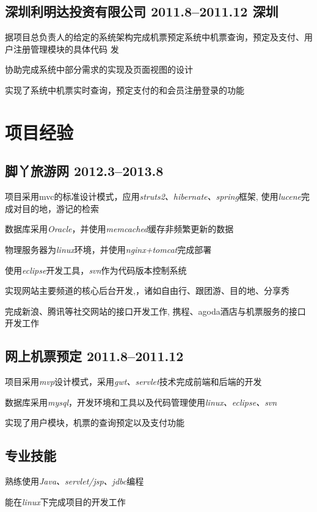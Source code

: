\documentclass[11pt,a4paper]{article}
\renewenvironment{itemize}{
  \begin{list}{}{
    \setlength{\leftmargin}{1.5em}
  }
}{
  \end{list}
}
\begin{document}
\subsection*{深圳利明达投资有限公司 2011.8--2011.12 深圳}

\begin{itemize}
  \item 据项目总负责人的给定的系统架构完成机票预定系统中机票查询，预定及支付、用户注册管理模块的具体代码
    发
  \item 协助完成系统中部分需求的实现及页面视图的设计
  \item 实现了系统中机票实时查询，预定支付的和会员注册登录的功能
\end{itemize}

\section*{项目经验}

\subsection*{脚丫旅游网 2012.3--2013.8}

\begin{itemize}
\item 项目采用mvc的标准设计模式，应用{\it struts2、hibernate、spring}框架, 使用{\it lucene}完成对目的地，游记的检索
\item 数据库采用{\it Oracle}，并使用{\it memcached}缓存非频繁更新的数据
\item 物理服务器为{\it linux}环境，并使用{\it nginx+tomcat}完成部署
\item 使用{\it eclipse}开发工具，{\it svn}作为代码版本控制系统
\item 实现网站主要频道的核心后台开发,，诸如自由行、跟团游、目的地、分享秀
\item 完成新浪、腾讯等社交网站的接口开发工作,  携程、agoda酒店与机票服务的接口开发工作
\end{itemize}

\subsection*{网上机票预定 2011.8--2011.12}

\begin{itemize}
\item 项目采用{\it mvp}设计模式，采用{\it gwt、servlet}技术完成前端和后端的开发
\item 数据库采用{\it mysql}，开发环境和工具以及代码管理使用{\it linux、eclipse、svn}
\item 实现了用户模块，机票的查询预定以及支付功能
\end{itemize}

\subsection*{专业技能}

\begin{itemize}
\item 熟练使用{\it Java、servlet/jsp、jdbc}编程
\item 能在{\it linux}下完成项目的开发工作
\end{itemize}
\end{document}
